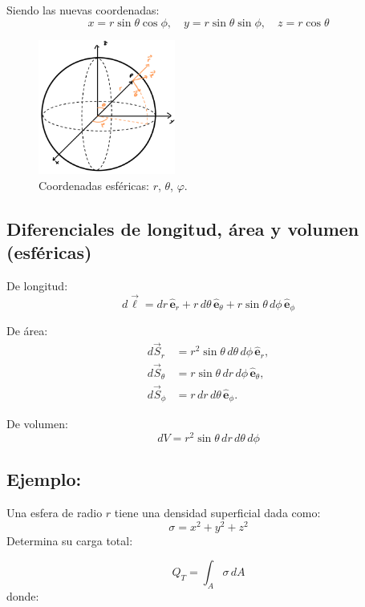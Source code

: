 \documentclass[a4paper,12pt]{article}
\begin{document}
\noindent Siendo las nuevas coordenadas:
\[
x = r\sin\theta\cos\phi, \quad y = r\sin\theta\sin\phi, \quad z = r\cos\theta
\]
\vspace{-2.0em}
\begin{figure}[htbp]
  \centering
  \includegraphics[width=0.40\textwidth]{esfericas.jpg}
  \caption{Coordenadas esféricas: $r$, $\theta$, $\varphi$.}
  \label{fig:esfericas}
\end{figure}

\subsection*{Diferenciales de longitud, área y volumen (esféricas)}

De longitud:
\[
d\vec{\ell} = dr\,\hat{\mathbf e}_r + r\,d\theta\,\hat{\mathbf e}_\theta + r\sin\theta\,d\phi\,\hat{\mathbf e}_\phi
\]

De área:
\[
\begin{aligned}
d\vec{S}_r      &= r^{2}\sin\theta\,d\theta\,d\phi\,\hat{\mathbf e}_r, \\
d\vec{S}_\theta &= r\sin\theta\,dr\,d\phi\,\hat{\mathbf e}_\theta, \\
d\vec{S}_\phi   &= r\,dr\,d\theta\,\hat{\mathbf e}_\phi.
\end{aligned}
\]

De volumen:
\[
dV = r^{2}\sin\theta\,dr\,d\theta\,d\phi
\]

\subsection*{Ejemplo:}
\noindent
Una esfera de radio $r$ tiene una densidad superficial dada como:
\[
\sigma = x^{2} + y^{2} + z^{2}
\]
Determina su carga total:

\[
Q_T = \int_{A} \sigma\, dA
\]
donde:
\end{document}
